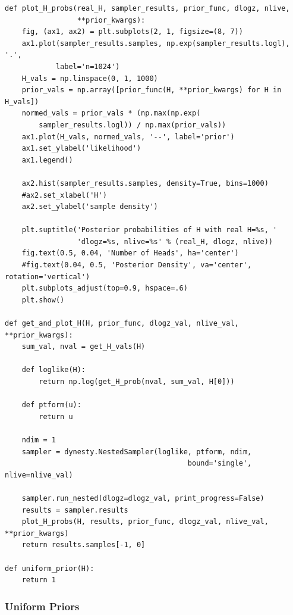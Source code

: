 \documentclass[11pt]{article}
\begin{document}
\begin{verbatim}
def plot_H_probs(real_H, sampler_results, prior_func, dlogz, nlive, 
                 **prior_kwargs):
    fig, (ax1, ax2) = plt.subplots(2, 1, figsize=(8, 7))
    ax1.plot(sampler_results.samples, np.exp(sampler_results.logl), '.',
            label='n=1024')
    H_vals = np.linspace(0, 1, 1000)
    prior_vals = np.array([prior_func(H, **prior_kwargs) for H in H_vals])
    normed_vals = prior_vals * (np.max(np.exp(
        sampler_results.logl)) / np.max(prior_vals))
    ax1.plot(H_vals, normed_vals, '--', label='prior')
    ax1.set_ylabel('likelihood')
    ax1.legend()

    ax2.hist(sampler_results.samples, density=True, bins=1000)
    #ax2.set_xlabel('H')
    ax2.set_ylabel('sample density')

    plt.suptitle('Posterior probabilities of H with real H=%s, '
                 'dlogz=%s, nlive=%s' % (real_H, dlogz, nlive))
    fig.text(0.5, 0.04, 'Number of Heads', ha='center')
    #fig.text(0.04, 0.5, 'Posterior Density', va='center', rotation='vertical')
    plt.subplots_adjust(top=0.9, hspace=.6)
    plt.show()

def get_and_plot_H(H, prior_func, dlogz_val, nlive_val, **prior_kwargs):
    sum_val, nval = get_H_vals(H)

    def loglike(H):
        return np.log(get_H_prob(nval, sum_val, H[0]))

    def ptform(u):
        return u

    ndim = 1
    sampler = dynesty.NestedSampler(loglike, ptform, ndim,
                                           bound='single', nlive=nlive_val) 

    sampler.run_nested(dlogz=dlogz_val, print_progress=False)
    results = sampler.results
    plot_H_probs(H, results, prior_func, dlogz_val, nlive_val, **prior_kwargs)
    return results.samples[-1, 0]
    
def uniform_prior(H):
    return 1
\end{verbatim}

\subsubsection*{Uniform Priors}
\label{sec-1-3-1}
\end{document}
